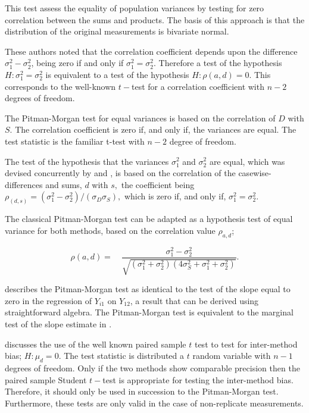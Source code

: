 \documentclass[12pt, a4paper]{report}
\theoremstyle{plain}
\theoremstyle{definition}
\theoremstyle{remark}
\begin{document}
This test assess the equality
of population variances by testing for zero correlation between the sums and products. The basis of this approach is that the distribution of the original measurements is bivariate normal.

These authors noted that the correlation coefficient depends
upon the difference $\sigma^{2}_{1}- \sigma^{2}_{2}$, being zero
if and only if $\sigma^{2}_{1}=\sigma^{2}_{2}$.
Therefore a test of the hypothesis $H: \sigma^{2}_{1}=\sigma^{2}_{2}$ is equivalent to a test of the hypothesis $H: \rho(a,d) = 0$. This corresponds to the well-known $t-$test for a correlation coefficient with $n-2$ degrees of freedom. 

The Pitman-Morgan test for equal variances is based on the correlation of $D$ with $S$. The correlation coefficient is zero if, and only if, the variances are equal. The test statistic is the familiar t-test with $n-2$ degree of freedom. 






The test of the hypothesis that the variances $\sigma^2_1$ and $\sigma^2_2$ are equal, which was devised concurrently by \citet{pitman} and \citet{morgan}, 
is based on the correlation of the casewise-differences and sums, $d$ with $s,$ the coefficient being $ \rho_{(d,s)} = (\sigma^2_1 -\sigma^2_2) / ( \sigma_D \sigma_S ),$ which is zero if, and only
if, $\sigma^2_1 = \sigma^2_2.$ 

The classical Pitman-Morgan test can be adapted as a hypothesis test of equal variance for both methods, based on the correlation value $\rho_{a,d}$;

\begin{equation}
\rho(a,d)=\quad\frac{\sigma^{2}_{1}-\sigma^{2}_{2}}{\sqrt{(\sigma^{2}_{1}+\sigma^{2}_{2})(4\sigma^{2}_{S}+\sigma^{2}_{1}+\sigma^{2}_{2})}}.
\end{equation}

\citet{Bartko} describes the Pitman-Morgan test as identical to the test of the slope equal to zero in the regression of $Y_{i1}$ on $Y_{12}$, a result that can be derived using straightforward algebra. The Pitman-Morgan test is equivalent to the marginal test of the slope estimate in \citet{BB89}.

\citet{Bartko} discusses the use of the well known paired sample $t$ test to test for inter-method bias; $H: \mu_{d}=0$. The test statistic is distributed a $t$ random variable with $n-1$ degrees of freedom. Only if the two methods show comparable precision then the paired sample Student $t-$test is appropriate for testing the inter-method bias. Therefore, it should only be used in succession to the Pitman-Morgan test. Furthermore, these tests are only valid in the case of non-replicate measurements.
\end{document}
